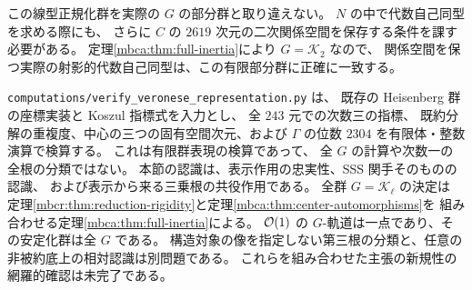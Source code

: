 この線型正規化群を実際の $G$ の部分群と取り違えない。
$N$ の中で代数自己同型を求める際にも、
さらに $C$ の $2619$ 次元の二次関係空間を保存する条件を課す必要がある。
定理\ref{mbca:thm:full-inertia}により $G=\mathcal K_2$ なので、
関係空間を保つ実際の射影的代数自己同型は、この有限部分群に正確に一致する。

\begin{remark}[検算と残る認識]
\label{mbva:rem:verification}
\texttt{computations/verify\_veronese\_representation.py} は、
既存の Heisenberg 群の座標実装と Koszul 指標式を入力とし、
全 $243$ 元での次数三の指標、
既約分解の重複度、中心の三つの固有空間次元、および
$\Gamma$ の位数 $2304$ を有限体・整数演算で検算する。
これは有限群表現の検算であって、
全 $G$ の計算や次数一の全根の分類ではない。
本節の認識は、表示作用の忠実性、SSS 関手そのものの認識、
および表示から来る三乗根の共役作用である。
全群 $G=\mathcal K_\ell$ の決定は
定理\ref{mbcr:thm:reduction-rigidity}と定理\ref{mbca:thm:center-automorphisms}を
組み合わせる定理\ref{mbca:thm:full-inertia}による。
$\mathcal O(1)$ の $G$-軌道は一点であり、その安定化群は全 $G$ である。
構造対象の像を指定しない第三根の分類と、任意の非被約底上の相対認識は別問題である。
これらを組み合わせた主張の新規性の網羅的確認は未完了である。
\end{remark}
